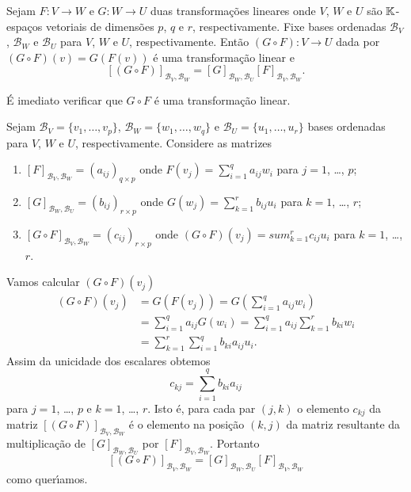 \begin{teorema}\label{matriz_da_composicao_de_transformacoes}
	Sejam $F : V \to W$ e $G : W \to U$ duas transforma\c{c}\~oes lineares onde $V$, $W$ e $U$ s\~ao $\mathbb{K}$-espa\c{c}os vetoriais de dimens\~oes $p$, $q$ e $r$, respectivamente. Fixe bases ordenadas $\mathcal{B}_V$, $\mathcal{B}_W$ e $\mathcal{B}_U$ para $V$, $W$ e $U$, respectivamente. Ent\~ao $(G \circ F) : V \to U$ dada por $(G\circ F)(v) = G(F(v))$ \'e uma transforma\c{c}\~ao linear e
	\[
		[(G \circ F)]_{{\mathcal{B}_V},{\mathcal{B}_W}} = [G]_{{\mathcal{B}_W},{\mathcal{B}_U}}[F]_{{\mathcal{B}_V},{\mathcal{B}_W}}.
	\]
\end{teorema}
\begin{prova}
	\'E imediato verificar que $G\circ F$ \'e uma transforma\c{c}\~ao linear.

	Sejam $\mathcal{B}_V = \{v_1,\dots,v_p\}$, $\mathcal{B}_W = \{w_1,\dots,w_q\}$ e $\mathcal{B}_U = \{u_1,\dots,u_r\}$ bases ordenadas para $V$, $W$ e $U$, respectivamente. Considere as matrizes
	\begin{enumerate}
		\item $[F]_{{\mathcal{B}_V},{\mathcal{B}_W}} = (a_{ij})_{q\times p}$ onde $F(v_j) = \sum_{i=1}^qa_{ij}w_i$ para $j=1$, \dots, $p$;
		\item $[G]_{{\mathcal{B}_W},{\mathcal{B}_U}} = (b_{ij})_{r\times p}$ onde $G(w_j) = \sum_{k=1}^rb_{ij}u_i$ para $k=1$, \dots, $r$;
		\item $[G \circ F]_{{\mathcal{B}_V},{\mathcal{B}_W}} = (c_{ij})_{r\times p}$ onde $(G\circ F)(v_j) = sum_{k=1}^rc_{ij}u_i$ para $k=1$, \dots, $r$.
	\end{enumerate}

	Vamos calcular $(G\circ F)(v_j)$
	\begin{align*}
		(G\circ F)(v_j) &= G(F(v_j)) = G(\sum_{i=1}^qa_{ij}w_i)\\
		&= \sum_{i=1}^qa_{ij}G(w_i) = \sum_{i=1}^qa_{ij}\sum_{k=1}^rb_{ki}w_i\\
		&= \sum_{k=1}^r\sum_{i=1}^qb_{ki}a_{ij}u_i.
	\end{align*}
	Assim da unicidade dos escalares obtemos
	\[
		c_{kj} = \sum_{i=1}^qb_{ki}a_{ij}
	\]
	para $j=1$, \dots, $p$ e $k = 1$, \dots, $r$. Isto \'e, para cada par $(j,k)$ o elemento $c_{kj}$ da matriz $[(G\circ F)]_{{\mathcal{B}_V},{\mathcal{B}_W}}$ \'e o elemento na posi\c{c}\~ao $(k,j)$ da matriz resultante da multiplica\c{c}\~ao de $[G]_{{\mathcal{B}_W},{\mathcal{B}_U}}$ por $[F]_{{\mathcal{B}_V},{\mathcal{B}_W}}$. Portanto
	\[
		[(G\circ F)]_{{\mathcal{B}_V},{\mathcal{B}_W}} = [G]_{{\mathcal{B}_W},{\mathcal{B}_U}}[F]_{{\mathcal{B}_V},{\mathcal{B}_W}}
	\]
	como quer{\'\i}amos.
\end{prova}

